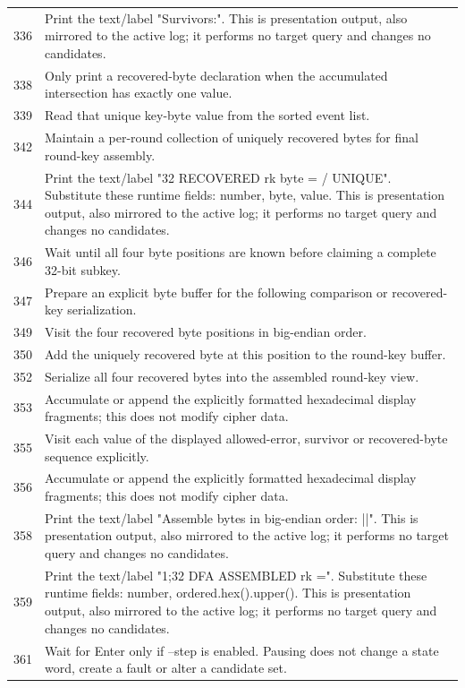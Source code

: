 \begin{longtable}{r >{\raggedright\arraybackslash}p{138mm}}
336&Print the text/label "Survivors:". This is presentation output, also mirrored to the active log; it performs no target query and changes no candidates.\\
338&Only print a recovered-byte declaration when the accumulated intersection has exactly one value.\\
339&Read that unique key-byte value from the sorted event list.\\
342&Maintain a per-round collection of uniquely recovered bytes for final round-key assembly.\\
344&Print the text/label "32 RECOVERED rk  byte   =   / UNIQUE". Substitute these runtime fields: number, byte, value. This is presentation output, also mirrored to the active log; it performs no target query and changes no candidates.\\
346&Wait until all four byte positions are known before claiming a complete 32-bit subkey.\\
347&Prepare an explicit byte buffer for the following comparison or recovered-key serialization.\\
349&Visit the four recovered byte positions in big-endian order.\\
350&Add the uniquely recovered byte at this position to the round-key buffer.\\
352&Serialize all four recovered bytes into the assembled round-key view.\\
353&Accumulate or append the explicitly formatted hexadecimal display fragments; this does not modify cipher data.\\
355&Visit each value of the displayed allowed-error, survivor or recovered-byte sequence explicitly.\\
356&Accumulate or append the explicitly formatted hexadecimal display fragments; this does not modify cipher data.\\
358&Print the text/label "Assemble bytes in big-endian order:   ||". This is presentation output, also mirrored to the active log; it performs no target query and changes no candidates.\\
359&Print the text/label "1;32 DFA ASSEMBLED rk  =". Substitute these runtime fields: number, ordered.hex().upper(). This is presentation output, also mirrored to the active log; it performs no target query and changes no candidates.\\
361&Wait for Enter only if --step is enabled. Pausing does not change a state word, create a fault or alter a candidate set.\\
\bottomrule\end{longtable}\endgroup

